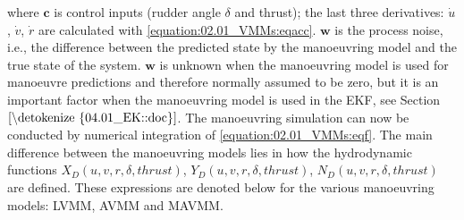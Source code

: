 \documentclass[review]{elsarticle}
\begin{document}
\sphinxAtStartPar
where \(\mathbf{c}\) is control inputs (rudder angle \(\delta\) and thrust); the last three derivatives: \(\dot{u}\), \(\dot{v}\), \(\dot{r}\) are calculated with \autoref{equation:02.01_VMMs:eqacc}.
\(\mathbf{w}\) is the process noise, i.e., the difference between the predicted state by the manoeuvring model and the true
state of the system. \(\mathbf{w}\) is unknown when the manoeuvring model is used for manoeuvre predictions and therefore normally
assumed to be zero, but it is an important factor when the manoeuvring model is used in the EKF, see Section \(\ref{\detokenize{04.01_EK::doc}}\).
The manoeuvring simulation can now be conducted by numerical integration of \autoref{equation:02.01_VMMs:eqf}. The main difference between the manoeuvring models lies in how the hydrodynamic functions \(X_D(u,v,r,\delta,thrust)\), \(Y_D(u,v,r,\delta,thrust)\), \(N_D(u,v,r,\delta,thrust)\) are defined. These expressions are denoted below for the various manoeuvring models: LVMM, AVMM and MAVMM.
\end{document}
